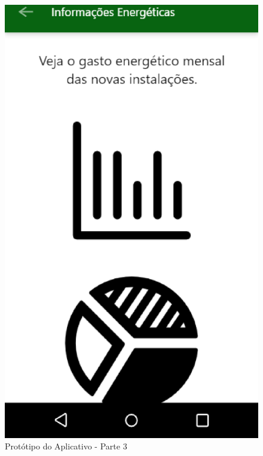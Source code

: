 \begin{anexosenv}
\begin{figure}[!h]
  \centering
  \includegraphics[keepaspectratio=true,scale=0.6]{figuras/prot-2.eps}
  \caption{Protótipo do Aplicativo - Parte 3}
\end{figure}


\end{anexosenv}
